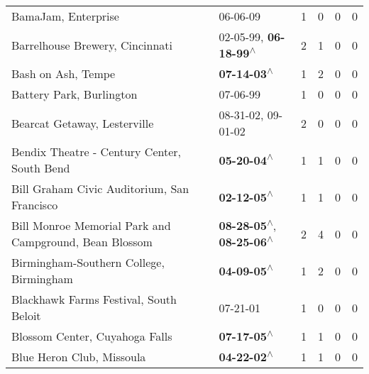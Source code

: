 \begin{supertabular}{p{0.4\textwidth}p{0.3\textwidth}p{0.05\textwidth}p{0.05\textwidth}p{0.05\textwidth}p{0.05\textwidth}}
                                                          BamaJam, Enterprise &                                                                  06-06-09\textsuperscript{} &  1 &  0 &  0 &  0 \\
                                              Barrelhouse Brewery, Cincinnati &                     02-05-99\textsuperscript{}, \textbf{06-18-99\textsuperscript{$\wedge$}} &  2 &  1 &  0 &  0 \\
                                                           Bash on Ash, Tempe &                                                 \textbf{07-14-03\textsuperscript{$\wedge$}} &  1 &  2 &  0 &  0 \\
                                                     Battery Park, Burlington &                                                                  07-06-99\textsuperscript{} &  1 &  0 &  0 &  0 \\
                                                 Bearcat Getaway, Lesterville &                                      08-31-02\textsuperscript{}, 09-01-02\textsuperscript{} &  2 &  0 &  0 &  0 \\
                                  Bendix Theatre - Century Center, South Bend &                                                 \textbf{05-20-04\textsuperscript{$\wedge$}} &  1 &  1 &  0 &  0 \\
                                  Bill Graham Civic Auditorium, San Francisco &                                                 \textbf{02-12-05\textsuperscript{$\wedge$}} &  1 &  1 &  0 &  0 \\
                       Bill Monroe Memorial Park and Campground, Bean Blossom &    \textbf{08-28-05\textsuperscript{$\wedge$}}, \textbf{08-25-06\textsuperscript{$\wedge$}} &  2 &  4 &  0 &  0 \\
                                      Birmingham-Southern College, Birmingham &                                                 \textbf{04-09-05\textsuperscript{$\wedge$}} &  1 &  2 &  0 &  0 \\
                                       Blackhawk Farms Festival, South Beloit &                                                                  07-21-01\textsuperscript{} &  1 &  0 &  0 &  0 \\
                                               Blossom Center, Cuyahoga Falls &                                                 \textbf{07-17-05\textsuperscript{$\wedge$}} &  1 &  1 &  0 &  0 \\
                                                    Blue Heron Club, Missoula &                                                 \textbf{04-22-02\textsuperscript{$\wedge$}} &  1 &  1 &  0 &  0 \\

\end{supertabular}
